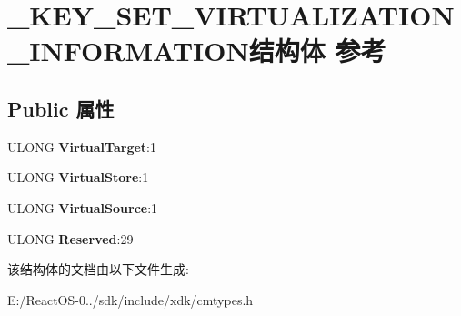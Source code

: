 \hypertarget{struct___k_e_y___s_e_t___v_i_r_t_u_a_l_i_z_a_t_i_o_n___i_n_f_o_r_m_a_t_i_o_n}{}\section{\+\_\+\+K\+E\+Y\+\_\+\+S\+E\+T\+\_\+\+V\+I\+R\+T\+U\+A\+L\+I\+Z\+A\+T\+I\+O\+N\+\_\+\+I\+N\+F\+O\+R\+M\+A\+T\+I\+O\+N结构体 参考}
\label{struct___k_e_y___s_e_t___v_i_r_t_u_a_l_i_z_a_t_i_o_n___i_n_f_o_r_m_a_t_i_o_n}
\subsection*{Public 属性}
\begin{DoxyCompactItemize}
\item 
\mbox{\label{struct___k_e_y___s_e_t___v_i_r_t_u_a_l_i_z_a_t_i_o_n___i_n_f_o_r_m_a_t_i_o_n_a8f38a48e0cc0bff9083944349db406c8}} 
U\+L\+O\+NG {\bfseries Virtual\+Target}\+:1
\item 
\mbox{\label{struct___k_e_y___s_e_t___v_i_r_t_u_a_l_i_z_a_t_i_o_n___i_n_f_o_r_m_a_t_i_o_n_a88e216cc738c4c08cda465900a578929}} 
U\+L\+O\+NG {\bfseries Virtual\+Store}\+:1
\item 
\mbox{\label{struct___k_e_y___s_e_t___v_i_r_t_u_a_l_i_z_a_t_i_o_n___i_n_f_o_r_m_a_t_i_o_n_ac390707fbeb205809196db0856a93e80}} 
U\+L\+O\+NG {\bfseries Virtual\+Source}\+:1
\item 
\mbox{\label{struct___k_e_y___s_e_t___v_i_r_t_u_a_l_i_z_a_t_i_o_n___i_n_f_o_r_m_a_t_i_o_n_a04e1568216cf4059a7025a56e98fa54c}} 
U\+L\+O\+NG {\bfseries Reserved}\+:29
\end{DoxyCompactItemize}


该结构体的文档由以下文件生成\+:\begin{DoxyCompactItemize}
\item 
E\+:/\+React\+O\+S-\/0../sdk/include/xdk/cmtypes.\+h\end{DoxyCompactItemize}
